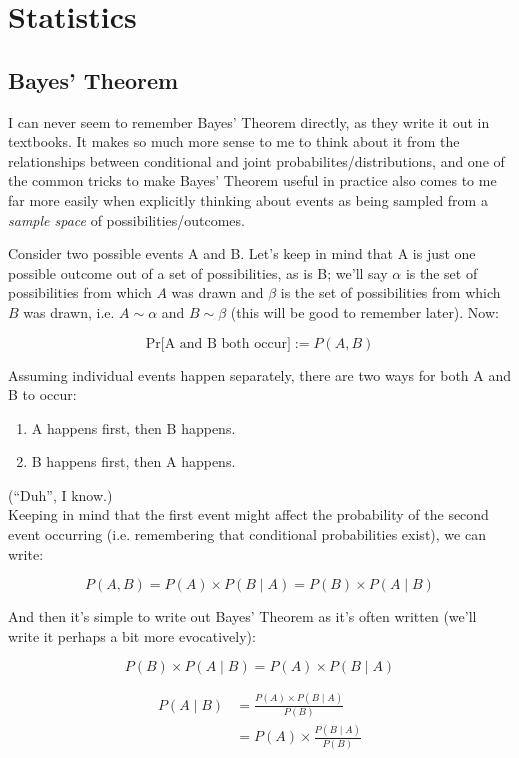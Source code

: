 \documentclass[../main/main.tex]{subfiles}
\begin{document}
\chapter{Statistics}\label{statistics}
\section{Bayes' Theorem}\label{bayes-theorem}

I can never seem to remember Bayes' Theorem directly, as they write it
out in textbooks. It makes so much more sense to me to think about it
from the relationships between conditional and joint
probabilites/distributions, and one of the common tricks to make Bayes'
Theorem useful in practice also comes to me far more easily when
explicitly thinking about events as being sampled from a \emph{sample
space} of possibilities/outcomes.

Consider two possible events A and B. Let's keep in mind that A is just
one possible outcome out of a set of possibilities, as is B; we'll say
\(\alpha\) is the set of possibilities from which \(A\) was drawn and
\(\beta\) is the set of possibilities from which \(B\) was drawn, i.e.
\(A \sim \alpha\) and \(B \sim \beta\) (this will be good to remember
later). Now:

\[ \text{Pr[A and B both occur]} := P(A,B) \]

Assuming individual events happen separately, there are two ways for
both A and B to occur: 
\begin{enumerate}
  \tightlist
    \item
      A happens first, then B happens. 
    \item 
      B happens first, then A happens.
\end{enumerate}
(``Duh'', I know.)
\\
Keeping in mind that the first event might affect the probability of the
second event occurring (i.e. remembering that conditional probabilities
exist), we can write:

\[ P(A,B) = P(A) \times P(B \mid A) = P(B) \times P(A \mid B) \]

And then it's simple to write out Bayes' Theorem as it's often written
(we'll write it perhaps a bit more evocatively):

\[ P(B) \times P(A \mid B) = P(A) \times P(B \mid A) \]

\[\begin{split} P(A \mid B) &= \frac{P(A) \times P(B \mid A)} {P(B)} \\
                        &= P(A) \times \frac {P(B \mid A)} {P(B)} \end{split}\]
\end{document}

